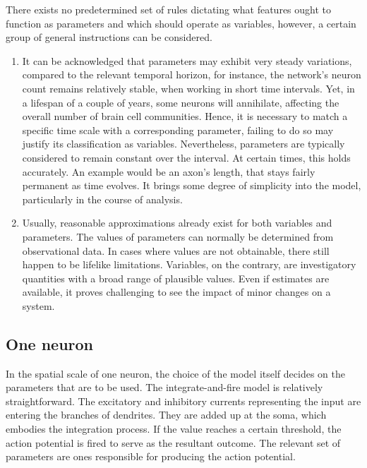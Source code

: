\documentclass[class={myRUCProject}, crop=false]{standalone}
\begin{document}
There exists no predetermined set of rules dictating what features ought to function as parameters and which should operate as variables, however, a certain group of general instructions can be considered. 
\begin{enumerate}
\item It can be acknowledged that parameters may exhibit very steady variations, compared to the relevant temporal horizon, for instance, the network's neuron count remains relatively stable, when working in short time intervals. Yet, in a lifespan of a couple of years, some neurons will annihilate, affecting the overall number of brain cell communities. Hence, it is necessary to match a specific time scale with a corresponding parameter, failing to do so may justify its classification as variables. Nevertheless, parameters are typically considered to remain constant over the interval. At certain times, this holds accurately. An example would be an axon’s length, that stays fairly permanent as time evolves. It brings some degree of simplicity into the model, particularly in the course of analysis. 
\item Usually, reasonable approximations already exist for both variables and parameters. The values of parameters can normally be determined from observational data. In cases where values are not obtainable, there still happen to be lifelike limitations. Variables, on the contrary, are investigatory quantities with a broad range of plausible values. Even if estimates are available, it proves challenging to see the impact of minor changes on a system. 
\end{enumerate}

\subsection{One neuron}

In the spatial scale of one neuron, the choice of the model itself decides on the parameters that are to be used. The integrate-and-fire model is relatively straightforward. The excitatory and inhibitory currents representing the input are entering the branches of dendrites. They are added up at the soma, which embodies the integration process. If the value reaches a certain threshold, the action potential is fired to serve as the resultant outcome. The relevant set of parameters are ones responsible for producing the action potential. 
\end{document}
